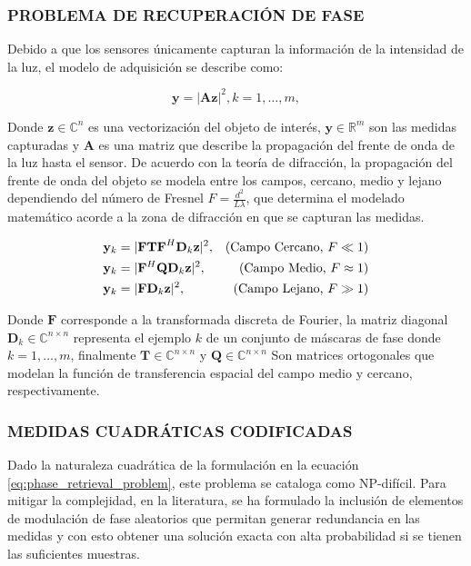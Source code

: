 \subsubsection{PROBLEMA DE RECUPERACIÓN DE FASE}

Debido a que los sensores únicamente capturan la información de la intensidad de la luz, el modelo de adquisición se describe como:

\begin{equation}
    \mathbf{y} = \vert \mathbf{A}\mathbf{z} \vert^2, k=1,\dots, m, 
    \label{eq:phase_retrieval_problem}
\end{equation}

Donde $\mathbf{z} \in {\mathbb{C}}^{n}$ es una vectorización del objeto de interés, $\mathbf{y} \in \mathbb{R}^{m}$ son las medidas capturadas y $\mathbf{A}$ es una matriz que describe la propagación del frente de onda de la luz hasta el sensor. De acuerdo con la teoría de difracción\cite{poon2014introduction}, la propagación del frente de onda del objeto se modela entre los campos, cercano, medio y lejano dependiendo del número de Fresnel $F = \frac{d^2}{L\lambda}$, que determina el modelado matemático acorde a la zona de difracción en que se capturan las medidas.

\begin{align}
    \mathbf{y}_k &= \vert \mathbf{FTF}^{H}\mathbf{D}_k\mathbf{z} \vert^2, & \hfill (\text{Campo Cercano, }F \ll 1) \nonumber \\ 
    \mathbf{y}_k &= \vert \mathbf{F}^{H}\mathbf{Q}\mathbf{D}_k\mathbf{z} \vert^2,  & \hfill (\text{Campo Medio, }F \approx 1) \\
    \mathbf{y}_k &= \vert \mathbf{F}\mathbf{D}_k\mathbf{z} \vert^2,  & \hfill (\text{Campo Lejano, } F \gg 1)   \nonumber
    \label{eq:modelado_zonas_difraccion}
\end{align}

Donde $\mathbf{F}$ corresponde a la transformada discreta de Fourier, la matriz diagonal $\mathbf{D}_k \in \mathbb{C}^{n \times n}$ representa el ejemplo $k$ de un conjunto de máscaras de fase donde $k=1,\dots,m$, finalmente $\mathbf{T} \in \mathbb{C}^{n \times n}$ y $\mathbf{Q} \in \mathbb{C}^{n \times n}$ Son matrices ortogonales que modelan la función de transferencia espacial del campo medio y cercano, respectivamente\cite{poon2014introduction,goodman2005introduction}.


\subsubsection{MEDIDAS CUADRÁTICAS CODIFICADAS}
Dado la naturaleza cuadrática de la formulación en la ecuación \ref{eq:phase_retrieval_problem}, este problema se cataloga como NP-difícil. Para mitigar la complejidad, en la literatura, se ha formulado la inclusión de elementos de modulación de fase aleatorios que permitan generar redundancia en las medidas y con esto obtener una solución exacta con alta probabilidad si se tienen las suficientes muestras\cite{candes_CDP}.

